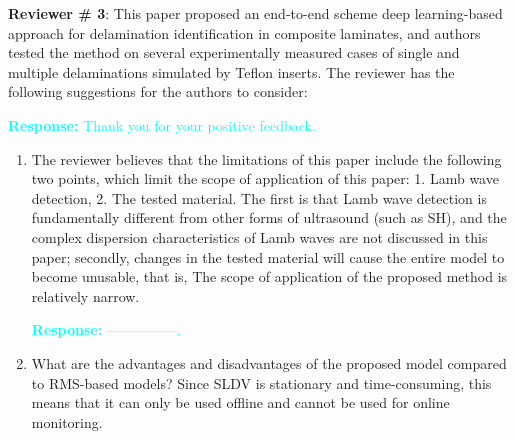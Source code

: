 \documentclass[11pt,a2paper]{report}
\begin{document}
\newpage 
\textbf{Reviewer \# 3}:
\newline This paper proposed an end-to-end scheme deep learning-based approach 
for delamination identification in composite laminates, and authors tested the 
method on several experimentally measured cases of single and multiple 
delaminations simulated by Teﬂon inserts.
The reviewer has the following suggestions for the authors to consider:

\textcolor{Cyan}{
	\newline\textbf{Response:}
	Thank you for your positive feedback.
}
\begin{enumerate}
	\item The reviewer believes that the limitations of this paper include the 
	following two points, which limit the scope of application of this paper: 
	1. Lamb wave detection, 2. The tested material. The first is that Lamb wave 
	detection is fundamentally different from other forms of ultrasound (such 
	as SH), and the complex dispersion characteristics of Lamb waves are not 
	discussed in this paper; secondly, changes in the tested material will 
	cause the entire model to become unusable, that is, The scope of 
	application of the proposed method is relatively narrow.
	
	\textcolor{Cyan}{
		\textbf{Response:}
		---------------.
	}
	
	\item What are the advantages and disadvantages of the proposed model 
	compared to RMS-based models? Since SLDV is stationary and time-consuming, 
	this means that it can only be used offline and cannot be used for online 
	monitoring.
	

\end{enumerate}
\end{document}
